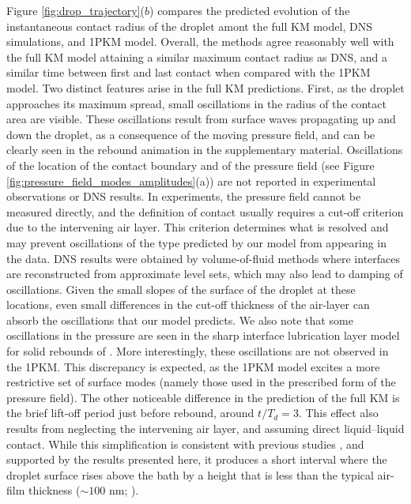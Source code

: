\documentclass{jfm}
\begin{document}
Figure \ref{fig:drop_trajectory}($b$) compares the predicted evolution of the instantaneous contact radius of the droplet amont the full KM model, DNS simulations, and 1PKM model. Overall, the methods agree reasonably well with the full KM model attaining a similar maximum contact radius as DNS, and a similar time between first and last contact when compared with the 1PKM model. Two distinct features arise in the full KM predictions. First, as the droplet approaches its maximum spread, small oscillations in the radius of the contact area are visible. These oscillations result from surface waves propagating up and down the droplet, as a consequence of the moving pressure field, and can be clearly seen in the rebound animation in the supplementary material. Oscillations of the location of the contact boundary and of the pressure field (see Figure \ref{fig:pressure_field_modes_amplitudes}(a)) are not reported in experimental observations or DNS results. In experiments, the pressure field cannot be measured directly, and the definition of contact usually requires a cut-off criterion due to the intervening air layer. This criterion determines what is resolved and may prevent oscillations of the type predicted by our model from appearing in the data. DNS results were obtained by volume-of-fluid methods where interfaces are reconstructed from approximate level sets, which may also lead to damping of oscillations. Given the small slopes of the surface of the droplet at these locations, even small differences in the cut-off thickness of the air-layer can absorb the oscillations that our model predicts. We also note that some oscillations in the pressure are seen in the sharp interface lubrication layer model for solid rebounds of \citet{phillips2024lubrication}. More interestingly, these oscillations are not observed in the 1PKM. This discrepancy is expected, as the 1PKM model excites a more restrictive set of surface modes (namely those used in the prescribed form of the pressure field). The other noticeable difference in the prediction of the full KM is the brief lift-off period just before rebound, around $t/T_d = 3$. This effect also results from neglecting the intervening air layer, and assuming direct liquid–liquid contact. While this simplification is consistent with previous studies \citep{AlventosaEtAl2023}, and supported by the results presented here, it produces a short interval where the droplet surface rises above the bath by a height that is less than the typical air-film thickness ($\sim 100$ nm; \citep{CouderEtAl2005Noncoalescence}).
\end{document}
